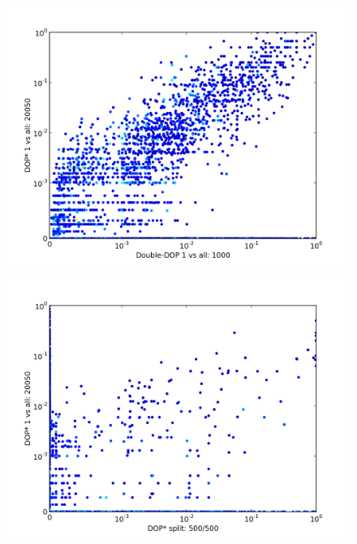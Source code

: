 \begin{figure}
\center
\includegraphics[width=\linewidth]{../data/plots/plot2}
\end{figure}


\begin{figure}
\center
\includegraphics[width=\linewidth]{../data/plots/plot3}
\end{figure}